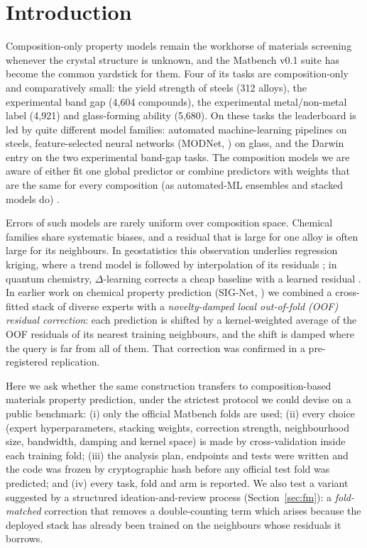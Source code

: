 \section{Introduction}
\label{sec:intro}

Composition-only property models remain the workhorse of materials screening whenever the crystal structure is unknown, and the Matbench v0.1 suite \citep{dunn2020matbench} has become the common yardstick for them.
Four of its tasks are composition-only and comparatively small: the yield strength of steels (312 alloys), the experimental band gap (4,604 compounds), the experimental metal/non-metal label (4,921) and glass-forming ability (5,680).
On these tasks the leaderboard \citep{matbenchboard} is led by quite different model families: automated machine-learning pipelines on steels, feature-selected neural networks (MODNet, \citealp{debreuck2021modnet}) on glass, and the Darwin entry on the two experimental band-gap tasks.
The composition models we are aware of either fit one global predictor or combine predictors with weights that are the same for every composition (as automated-ML ensembles and stacked models do) \citep{debreuck2021modnet,wang2021crabnet,goodall2020roost,gouvea2025mattervial,zou2025ecsg}.

Errors of such models are rarely uniform over composition space.
Chemical families share systematic biases, and a residual that is large for one alloy is often large for its neighbours.
In geostatistics this observation underlies regression kriging, where a trend model is followed by interpolation of its residuals \citep{hengl2007rk}; in quantum chemistry, $\Delta$-learning corrects a cheap baseline with a learned residual \citep{ramakrishnan2015delta}.
In earlier work on chemical property prediction (SIG-Net, \citealp{gurram2026signet}) we combined a cross-fitted stack of diverse experts \citep{wolpert1992stacked,breiman1996stacked,vanderlaan2007super} with a \emph{novelty-damped local out-of-fold (OOF) residual correction}: each prediction is shifted by a kernel-weighted average of the OOF residuals of its nearest training neighbours, and the shift is damped where the query is far from all of them.
That correction was confirmed in a pre-registered replication.

Here we ask whether the same construction transfers to composition-based materials property prediction, under the strictest protocol we could devise on a public benchmark:
(i) only the official Matbench folds are used;
(ii) every choice (expert hyperparameters, stacking weights, correction strength, neighbourhood size, bandwidth, damping and kernel space) is made by cross-validation inside each training fold;
(iii) the analysis plan, endpoints and tests were written and the code was frozen by cryptographic hash before any official test fold was predicted; and
(iv) every task, fold and arm is reported.
We also test a variant suggested by a structured ideation-and-review process (Section~\ref{sec:fm}): a \emph{fold-matched} correction that removes a double-counting term which arises because the deployed stack has already been trained on the neighbours whose residuals it borrows.

